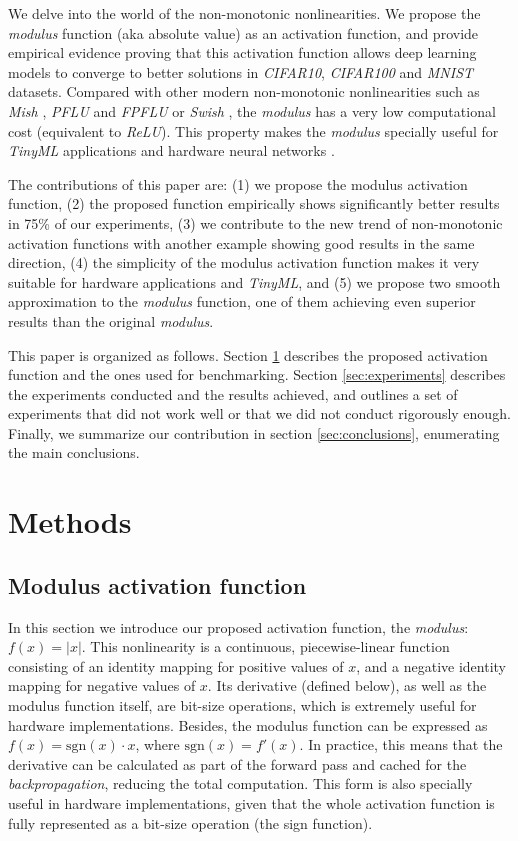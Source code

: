 We delve into the world of the non-monotonic nonlinearities. We propose the \textit{modulus} function (aka absolute value) as an activation function, and provide empirical evidence proving that this activation function allows deep learning models to converge to better solutions in \textit{CIFAR10}, \textit{CIFAR100} and \textit{MNIST} datasets. Compared with other modern non-monotonic nonlinearities such as \textit{Mish} \cite{misra2019mish}, \textit{PFLU} and \textit{FPFLU} \cite{zhu2020} or \textit{Swish}  \cite{ramachandran2018}, the \textit{modulus} has a very low computational cost (equivalent to \textit{ReLU}). This property makes the \textit{modulus} specially useful for \textit{TinyML} applications \cite{sanchez2020} and hardware neural networks \cite{Misra2010}. 

The contributions of this paper are: (1) we propose the modulus activation function, (2) the proposed function empirically shows significantly better results in 75\% of our experiments, (3) we contribute to the new trend of non-monotonic activation functions with another example showing good results in the same direction, (4) the simplicity of the modulus activation function makes it very suitable for hardware applications and \textit{TinyML}, and (5) we propose two smooth approximation to the \textit{modulus} function, one of them achieving even superior results than the original \textit{modulus}.

This paper is organized as follows. Section \ref{sec:methods} describes the proposed activation function and the ones used for benchmarking. Section \ref{sec:experiments} describes the experiments conducted and the results achieved, and outlines a set of experiments that did not work well or that we did not conduct rigorously enough. Finally, we summarize our contribution in section \ref{sec:conclusions}, enumerating the main conclusions.



\section{Methods} \label{sec:methods}
\subsection{Modulus activation function}
In this section we introduce our proposed activation function, the \textit{modulus}: $f(x)=|x|$. This nonlinearity is a continuous, piecewise-linear function consisting of an identity mapping for positive values of $x$, and a negative identity mapping for negative values of $x$. Its derivative (defined below), as well as the modulus function itself, are bit-size operations, which is extremely useful for hardware implementations. Besides, the modulus function can be expressed as $f(x) = \text{sgn}(x)\cdot x$, where $\text{sgn}(x) = f'(x)$. In practice, this means that the derivative can be calculated as part of the forward pass and cached for the \textit{backpropagation}, reducing the total computation. This form is also specially useful in hardware implementations, given that the whole activation function is fully represented as a bit-size operation (the sign function).


